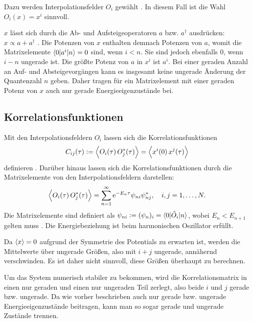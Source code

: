 Dazu werden Interpolationsfelder $O_i$ gewählt
\parencite[1]{Blossier/Eigenvalue}. In diesem Fall ist die Wahl $O_i(x) = x^i$
sinnvoll.

$x$ lässt sich durch die Ab- und Aufsteigeoperatoren $a$ bzw. $a^\dagger$
ausdrücken: $x \propto a + a^\dagger$
\parencite[(3.5a)]{Schwabl/Quantenmechanik}. Die Potenzen von $x$ enthalten
demnach Potenzen von $a$, womit die Matrixelemente $\braket{0|a^i|n} = 0$ sind,
wenn $i < n$. Sie sind jedoch ebenfalls 0, wenn $i - n$ ungerade ist. Die
größte Potenz von $a$ in $x^i$ ist $a^i$. Bei einer geraden Anzahl an Auf- und
Absteigevorgängen kann es insgesamt keine ungerade Änderung der Quantenzahl $n$
geben. Daher tragen für ein Matrixelement mit einer geraden Potenz von $x$ auch
nur gerade Energieeigenzustände bei.

\subsection{Korrelationsfunktionen}

Mit den Interpolationsfeldern $O_i$ lassen sich die Korrelationsfunktionen
\[
    C_{ij}(\tau) := \left\langle O_i(\tau) \, O_j^*(\tau) \right\rangle
    = \left\langle x^i(0) \, x^j(\tau) \right\rangle
\]
definieren \parencite[(2.1)]{Blossier/Eigenvalue}. Darüber hinaus lassen sich
die Korrelationsfunktionen durch die Matrixelemente von den
Interpolationsfeldern darstellen:
\[
    \left\langle O_i(\tau) \, O_j^*(\tau) \right\rangle
    = \sum_{n=1}^\infty \mathrm e^{-E_n \tau} \psi_{ni} \psi_{nj}^*
    ,\quad
    i, j = 1, \ldots, N.
\]
Die Matrixelemente sind definiert als $\psi_{ni} := (\psi_n)_i = \braket{0 |
\hat O_i | n}$, wobei $E_n < E_{n+1}$ gelten muss
\parencite[(2.1)]{Blossier/Eigenvalue}. Die Energiebeziehung ist beim
harmonischen Oszillator erfüllt.

Da $\langle x \rangle = 0$ aufgrund der Symmetrie des Potentials zu erwarten ist,
werden die Mittelwerte über ungerade Größen, also mit $i + j$ ungerade,
annähernd verschwinden. Es ist daher nicht sinnvoll, diese Größen überhaupt zu
berechnen.

Um das System numerisch stabiler zu bekommen, wird die Korrelationsmatrix in
einen nur geraden und einen nur ungeraden Teil zerlegt, also beide $i$ und $j$
gerade bzw. ungerade. Da wie vorher beschrieben auch nur gerade bzw. ungerade
Energieeigenzustände beitragen, kann man so sogar gerade und ungerade Zustände
trennen.

